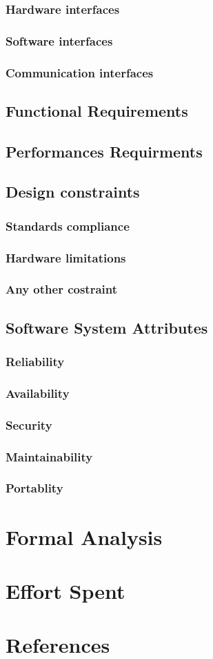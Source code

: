 \documentclass[12pt,a4paper]{report}
\begin{document}
		\subsection{Hardware interfaces}
		\subsection{Software interfaces}
		\subsection{Communication interfaces}
	\section{Functional Requirements}
	\section{Performances Requirments}
	\section{Design constraints}
		\subsection{Standards compliance}
		\subsection{Hardware limitations}
		\subsection{Any other costraint}
	\section{Software System Attributes}
		\subsection{Reliability}
		\subsection{Availability}
		\subsection{Security}
		\subsection{Maintainability}
		\subsection{Portablity}

\chapter{Formal Analysis}

\chapter{Effort Spent}

\chapter{References}
\end{document}
